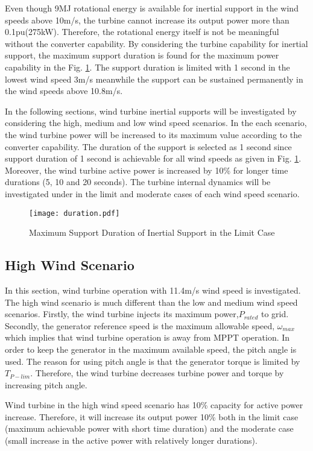 Even though 9MJ rotational energy is available for inertial support in the wind speeds above 10m/s, the turbine cannot increase its output power more than 0.1pu(275kW). Therefore, the rotational energy itself is not be meaningful without the converter capability. By considering the turbine capability for inertial support, the maximum support duration is found for the maximum power capability in the Fig. \ref{duration}. The support duration is limited with 1 second in the lowest wind speed 3m/s meanwhile the support can be sustained permanently in the wind speeds above 10.8m/s.\par 
In the following sections, wind turbine inertial supports will be investigated by considering the high, medium and low wind speed scenarios. In the each scenario, the wind turbine power will be increased to its maximum value according to the converter capability. The duration of the support is selected as 1 second since support duration of 1 second is achievable for all wind speeds as given in Fig. \ref{duration}. Moreover, the wind turbine active power is increased by 10\% for longer time durations (5, 10 and 20 seconds). The turbine internal dynamics will be investigated under in the limit and moderate cases of each wind speed scenario.
\begin{figure}[h!]
	\centering
	\texttt{[image: duration.pdf]}
	\caption{Maximum Support Duration of Inertial Support in the Limit Case}
	\label{duration}
\end{figure}
\subsection{High Wind Scenario}
In this section, wind turbine operation with 11.4m/s wind speed is investigated. The high wind scenario is much different than the low and medium wind speed scenarios. Firstly, the wind turbine injects its maximum power,$P_{rated}$ to grid. Secondly, the generator reference speed is the maximum allowable speed, $\omega_{max}$ which implies that wind turbine operation is away from MPPT operation. In order to keep the generator in the maximum available speed, the pitch angle is used. The reason for using pitch angle is that the generator torque is limited by $T_{P-lim}$. Therefore, the wind turbine decreases turbine power and torque by increasing pitch angle.\par
Wind turbine in the high wind speed scenario has 10\% capacity for active power increase. Therefore, it will increase its output power 10\% both in the limit case (maximum achievable power with short time duration) and the moderate case (small increase in the active power with relatively longer durations).
